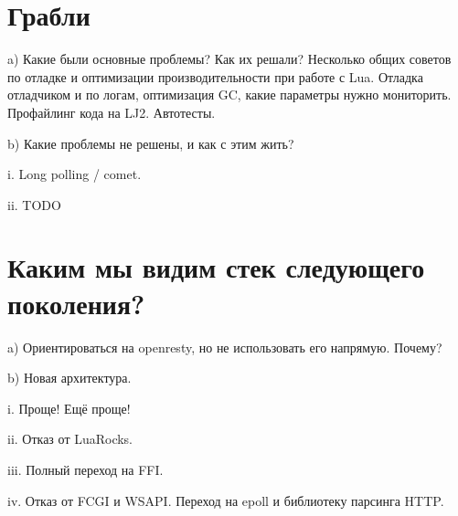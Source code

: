 \documentclass[aspectratio=169,handout,bigger]{beamer}
\begin{document}

\section{Грабли}

\begin{frame}
a) Какие были основные проблемы? Как их решали? Несколько общих советов по отладке и оптимизации производительности при работе с Lua. Отладка отладчиком и по логам, оптимизация GC, какие параметры нужно мониторить. Профайлинг кода на LJ2. Автотесты.
\end{frame}

\begin{frame}
b) Какие проблемы не решены, и как с этим жить?
\end{frame}

\begin{frame}
i. Long polling / comet.
\end{frame}

\begin{frame}
ii. TODO
\end{frame}


\section{Каким мы видим стек следующего поколения?}

\begin{frame}
a) Ориентироваться на openresty, но не использовать его напрямую. Почему?
\end{frame}

\begin{frame}
b) Новая архитектура.
\end{frame}

\begin{frame}
i. Проще! Ещё проще!
\end{frame}

\begin{frame}
ii. Отказ от LuaRocks.
\end{frame}

\begin{frame}
iii. Полный переход на FFI.
\end{frame}

\begin{frame}
iv. Отказ от FCGI и WSAPI. Переход на epoll и библиотеку парсинга HTTP.
\end{frame}
\end{document}

